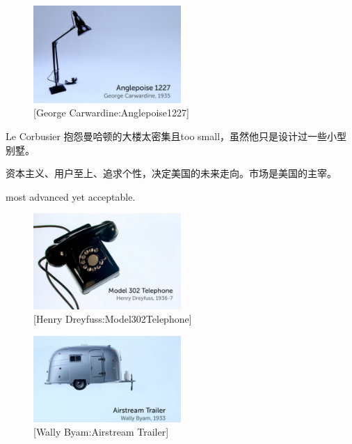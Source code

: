 \documentclass[UTF8]{../../../../RepresentationUniverse}
\begin{document}
\begin{figure}[h]
    \centering
    \includegraphics[width=0.5\textwidth]{./src/figures/Anglepoise1227_2023-04-09_19-21-53.png}
    \caption{[George Carwardine:Anglepoise1227]}
    \label{figure:Anglepoise1227}
\end{figure}


Le Corbusier 抱怨曼哈顿的大楼太密集且too small，虽然他只是设计过一些小型别墅。

资本主义、用户至上、追求个性，决定美国的未来走向。市场是美国的主宰。

most advanced yet acceptable. 

\begin{figure}[h]
    \centering
    \includegraphics[width=0.5\textwidth]{./src/figures/Model302Telephone_2023-04-09_19-31-13.png}
    \caption{[Henry Dreyfuss:Model302Telephone]}
    \label{figure:Model302Telephone}
\end{figure}


\begin{figure}[h]
    \centering
    \includegraphics[width=0.5\textwidth]{./src/figures/Airstream Trailer_2023-04-09_19-34-02.png}
    \caption{[Wally Byam:Airstream Trailer]}
    \label{figure:Airstream Trailer}
\end{figure}
\end{document}
